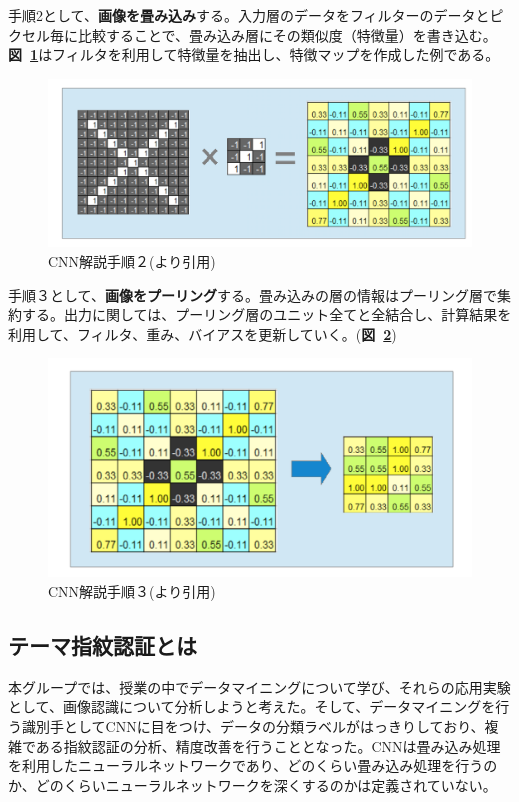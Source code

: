\documentclass[a4paper, 11pt, titlepage]{jsarticle}
\begin{document}
手順2として、\textbf{画像を畳み込み}する。入力層のデータをフィルターのデータとピクセル毎に比較することで、畳み込み層にその類似度（特徴量）を書き込む。\textbf{図~\ref{cnn2}}はフィルタを利用して特徴量を抽出し、特徴マップを作成した例である。

\begin{figure}[h]
  \centering
  \includegraphics[scale=0.3]{cnn2.png}
  \caption{CNN解説手順２(\cite{cnn}より引用)}
  \label{cnn2}
\end{figure}

手順３として、\textbf{画像をプーリング}する。畳み込みの層の情報はプーリング層で集約する。出力に関しては、プーリング層のユニット全てと全結合し、計算結果を利用して、フィルタ、重み、バイアスを更新していく。(\textbf{図~\ref{cnn3}})

\begin{figure}[h]
  \centering
  \includegraphics[scale=0.3]{cnn3.png}
  \caption{CNN解説手順３(\cite{cnn}より引用)}
  \label{cnn3}
\end{figure}


\subsection{テーマ指紋認証とは}
本グループでは、授業の中でデータマイニングについて学び、それらの応用実験として、画像認識について分析しようと考えた。そして、データマイニングを行う識別手としてCNNに目をつけ、データの分類ラベルがはっきりしており、複雑である指紋認証の分析、精度改善を行うこととなった。CNNは畳み込み処理を利用したニューラルネットワークであり、どのくらい畳み込み処理を行うのか、どのくらいニューラルネットワークを深くするのかは定義されていない。
\end{document}

